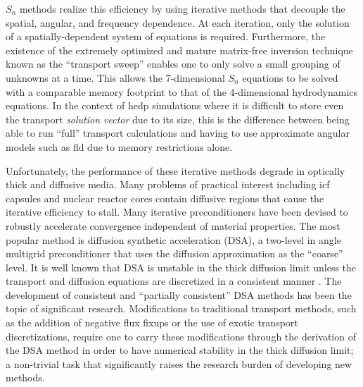\documentclass[../doc.tex]{subfiles}
\begin{document}
$S_n$ methods realize this efficiency by using iterative methods that decouple the spatial, angular, and frequency dependence. At each iteration, only the solution of a spatially-dependent system of equations is required. Furthermore, the existence of the extremely optimized and mature matrix-free inversion technique known as the ``transport sweep'' enables one to only solve a small grouping of unknowns at a time. This allows the 7-dimensional $S_n$ equations to be solved with a comparable memory footprint to that of the 4-dimensional hydrodynamics equations. In the context of \gls{hedp} simulations where it is difficult to store even the transport \emph{solution vector} due to its size, this is the difference between being able to run ``full'' transport calculations and having to use approximate angular models such as \gls{fld} due to memory restrictions alone. 

Unfortunately, the performance of these iterative methods degrade in optically thick and diffusive media. Many problems of practical interest including \gls{icf} capsules and nuclear reactor cores contain diffusive regions that cause the iterative efficiency to stall. Many iterative preconditioners have been devised to robustly accelerate convergence independent of material properties. The most popular method is diffusion synthetic acceleration (DSA), a two-level in angle multigrid preconditioner that uses the diffusion approximation as the ``coarse'' level. It is well known that DSA is unstable in the thick diffusion limit unless the transport and diffusion equations are discretized in a consistent manner \cite{A,LarsenDSA}. The development of consistent \cite{WWM} and ``partially consistent'' \cite{ML,AM,WR} DSA methods has been the topic of significant research. Modifications to traditional transport methods, such as the addition of negative flux fixups or the use of exotic transport discretizations, require one to carry these modifications through the derivation of the DSA method in order to have numerical stability in the thick diffusion limit; a non-trivial task that significantly raises the research burden of developing new methods. 
\end{document}
